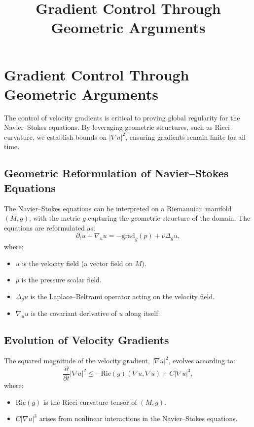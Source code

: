 \documentclass[12pt]{article}
\theoremstyle{definition}
\begin{document}
\title{Gradient Control Through Geometric Arguments}
\author{}
\date{}
\maketitle

\section{Gradient Control Through Geometric Arguments}

The control of velocity gradients is critical to proving global regularity for the Navier--Stokes equations. By leveraging geometric structures, such as Ricci curvature, we establish bounds on $|\nabla u|^2$, ensuring gradients remain finite for all time.

\subsection{Geometric Reformulation of Navier--Stokes Equations}
The Navier--Stokes equations can be interpreted on a Riemannian manifold $(M, g)$, with the metric $g$ capturing the geometric structure of the domain. The equations are reformulated as:
\begin{equation}
\partial_t u + \nabla_u u = -\text{grad}_g(p) + \nu \Delta_g u,
\end{equation}
where:
\begin{itemize}
    \item $u$ is the velocity field (a vector field on $M$).
    \item $p$ is the pressure scalar field.
    \item $\Delta_g u$ is the Laplace--Beltrami operator acting on the velocity field.
    \item $\nabla_u u$ is the covariant derivative of $u$ along itself.
\end{itemize}

\subsection{Evolution of Velocity Gradients}
The squared magnitude of the velocity gradient, $|\nabla u|^2$, evolves according to:
\begin{equation}
\frac{\partial}{\partial t} |\nabla u|^2 \leq -\text{Ric}(g)(\nabla u, \nabla u) + C |\nabla u|^3,
\end{equation}
where:
\begin{itemize}
    \item $\text{Ric}(g)$ is the Ricci curvature tensor of $(M, g)$.
    \item $C |\nabla u|^3$ arises from nonlinear interactions in the Navier--Stokes equations.
\end{itemize}
\end{document}
